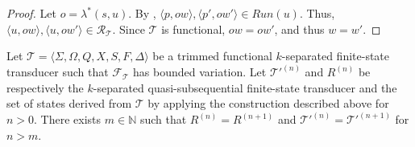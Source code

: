 \begin{proof}
  Let $o = \lambda^*(s, u)$. By , $\langle p, ow
  \rangle, \langle p', ow' \rangle \in Run(u)$. Thus, $\langle u, ow \rangle, \langle
  u, ow' \rangle \in \mathcal{R}_\mathcal{T}$. Since $\mathcal{T}$ is functional, $ow
  = ow'$, and thus $w = w'$.
\end{proof}

\begin{lemma}\label{lem:quasisubseq_completion}
  Let $\mathcal{T} = \langle \Sigma, \Omega, Q, X, S, F, \Delta \rangle$ be a trimmed
  functional $k$-separated finite-state transducer such that
  $\mathcal{F}_\mathcal{T}$ has bounded variation. Let $\mathcal{T'}^{(n)}$ and
  $R^{(n)}$ be respectively the $k$-separated quasi-subsequential finite-state
  transducer and the set of states derived from $\mathcal{T}$ by applying the
  construction described above for $n > 0$. There exists $m \in \mathbb{N}$ such that
  $R^{(n)} = R^{(n+1)}$ and $\mathcal{T}'^{(n)} = \mathcal{T}'^{(n+1)}$ for $n > m$.
\end{lemma}

